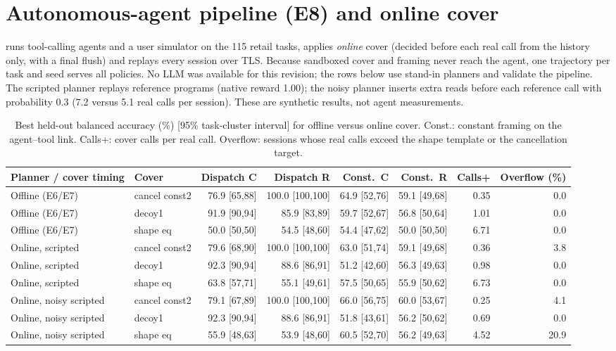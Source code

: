 \section{Autonomous-agent pipeline (E8) and online cover}\label{app:e8}
 runs tool-calling agents and a user simulator on the 115 retail tasks, applies \emph{online} cover (decided before each real call from the history only, with a final flush) and replays every session over TLS. Because sandboxed cover and framing never reach the agent, one trajectory per task and seed serves all policies. No LLM was available for this revision; the rows below use stand-in planners and validate the pipeline. The scripted planner replays reference programs (native reward 1.00); the noisy planner inserts extra reads before each reference call with probability 0.3 (7.2 versus 5.1 real calls per session). These are synthetic results, not agent measurements.
\begin{table}[!ht]\centering\scriptsize
\caption{Best held-out balanced accuracy (\%) [95\% task-cluster interval] for offline versus online cover. Const.: constant framing on the agent--tool link. Calls+: cover calls per real call. Overflow: sessions whose real calls exceed the shape template or the cancellation target.}
\begin{tabular}{@{}llrrrrrr@{}}\toprule
Planner / cover timing & Cover & Dispatch C & Dispatch R & Const.\ C & Const.\ R & Calls+ & Overflow (\%)\\\midrule
Offline (E6/E7) & cancel const2 & 76.9 [65,88] & 100.0 [100,100] & 64.9 [52,76] & 59.1 [49,68] & 0.35 & 0.0\\
Offline (E6/E7) & decoy1 & 91.9 [90,94] & 85.9 [83,89] & 59.7 [52,67] & 56.8 [50,64] & 1.01 & 0.0\\
Offline (E6/E7) & shape eq & 50.0 [50,50] & 54.5 [48,60] & 54.4 [47,62] & 50.0 [50,50] & 6.71 & 0.0\\
\midrule
Online, scripted & cancel const2 & 79.6 [68,90] & 100.0 [100,100] & 63.0 [51,74] & 59.1 [49,68] & 0.36 & 3.8\\
Online, scripted & decoy1 & 92.3 [90,94] & 88.6 [86,91] & 51.2 [42,60] & 56.3 [49,63] & 0.98 & 0.0\\
Online, scripted & shape eq & 63.8 [57,71] & 55.1 [49,61] & 57.5 [50,65] & 55.9 [50,62] & 6.73 & 0.0\\
\midrule
Online, noisy scripted & cancel const2 & 79.1 [67,89] & 100.0 [100,100] & 66.0 [56,75] & 60.0 [53,67] & 0.25 & 4.1\\
Online, noisy scripted & decoy1 & 92.3 [90,94] & 88.6 [86,91] & 51.8 [43,61] & 56.2 [50,62] & 0.69 & 0.0\\
Online, noisy scripted & shape eq & 55.9 [48,63] & 53.9 [48,60] & 60.5 [52,70] & 56.2 [49,63] & 4.52 & 20.9\\
\bottomrule\end{tabular}\end{table}
